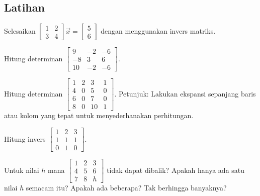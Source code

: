 \subsection{Latihan}

\begin{exercise}
Selesaikan
$\left[ \begin{smallmatrix}
1 & 2 \\
3 & 4
\end{smallmatrix} \right] \vec{x} =
\left[ \begin{smallmatrix}
5 \\
6
\end{smallmatrix} \right]$ dengan menggunakan invers matriks.
\end{exercise}

\begin{exercise}
Hitung determinan
$\left[ \begin{smallmatrix}
9 & -2 & -6 \\
-8 & 3 & 6 \\
10 & -2 & -6
\end{smallmatrix} \right]$.
\end{exercise}

\begin{exercise}
Hitung determinan
$\left[ \begin{smallmatrix}
1 & 2 & 3 & 1 \\
4 & 0 & 5 & 0 \\
6 & 0 & 7 & 0 \\
8 & 0 & 10 & 1
\end{smallmatrix} \right]$.  Petunjuk: Lakukan ekspansi sepanjang baris atau kolom yang tepat untuk
menyederhanakan perhitungan.
\end{exercise}

\begin{exercise}
Hitung invers
$\left[ \begin{smallmatrix}
1 & 2 & 3 \\
1 & 1 & 1 \\
0 & 1 & 0
\end{smallmatrix} \right]$.
\end{exercise}

\begin{exercise}
Untuk nilai $h$ mana
$\left[ \begin{smallmatrix}
1 & 2 & 3 \\
4 & 5 & 6 \\
7 & 8 & h
\end{smallmatrix} \right]$
tidak dapat dibalik?  Apakah hanya ada satu nilai $h$ semacam itu?  Apakah ada beberapa?  Tak
berhingga banyaknya?
\end{exercise}

